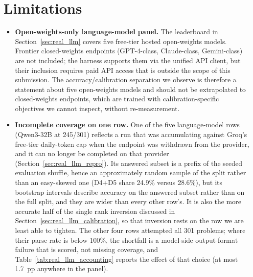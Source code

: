 \documentclass{article}
\begin{document}
\section{Limitations}
\label{sec:limitations}

\begin{itemize}[leftmargin=*,itemsep=3pt]
    \item \textbf{Open-weights-only language-model panel.} The leaderboard in Section~\ref{sec:real_llm} covers five free-tier hosted open-weights models. Frontier closed-weights endpoints (GPT-4-class, Claude-class, Gemini-class) are not included; the harness supports them via the unified API client, but their inclusion requires paid API access that is outside the scope of this submission. The accuracy/calibration separation we observe is therefore a statement about five open-weights models and should not be extrapolated to closed-weights endpoints, which are trained with calibration-specific objectives we cannot inspect, without re-measurement.
    \item \textbf{Incomplete coverage on one row.} One of the five language-model rows (Qwen3-32B at 245/301) reflects a run that was accumulating against Groq's free-tier daily-token cap when the endpoint was withdrawn from the provider, and it can no longer be completed on that provider (Section~\ref{sec:real_llm_repro}). Its answered subset is a prefix of the seeded evaluation shuffle, hence an approximately random sample of the split rather than an easy-skewed one (D4+D5 share 24.9\% versus 28.6\%), but its bootstrap intervals describe accuracy on the answered subset rather than on the full split, and they are wider than every other row's. It is also the more accurate half of the single rank inversion discussed in Section~\ref{sec:real_llm_calibration}, so that inversion rests on the row we are least able to tighten. The other four rows attempted all 301 problems; where their parse rate is below 100\%, the shortfall is a model-side output-format failure that is scored, not missing coverage, and Table~\ref{tab:real_llm_accounting} reports the effect of that choice (at most 1.7~pp anywhere in the panel).

\end{itemize}
\end{document}

